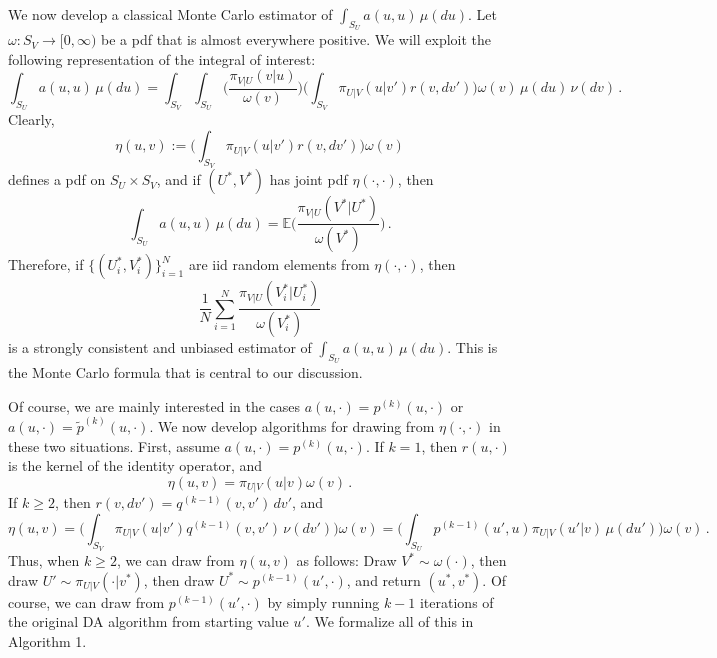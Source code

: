 \documentclass[11pt]{article}
\begin{document}
        We now develop a classical Monte Carlo estimator of
        $\int_{S_U} a(u,u) \, \mu(du)$.  Let $\omega:S_V \to
        [0,\infty)$ be a pdf that is almost everywhere positive.  We
        will exploit the following representation of the integral of
        interest:
	\begin{equation}\label{rep}
          \int_{S_U} a(u,u) \, \mu(du) = \int_{S_V} \int_{S_U} \bigg(\frac{\pi_{V|U}(v|u)}{\omega(v)}\bigg) \Big(\int_{S_V} \pi_{U|V}(u|v') r(v,dv') \Big) \omega(v) \, \mu(du) \,\nu(dv) \,.
	\end{equation}
	Clearly,
	\[
	\eta(u,v) := \Big(\int_{S_V} \pi_{U|V}(u|v') r(v,dv') \Big)
        \omega(v)
	\]
	defines a pdf on $S_U \times S_V$, and if $(U^*,V^*)$ has
        joint pdf $\eta(\cdot,\cdot)$, then
	\[
	\int_{S_U} a(u,u) \, \mu(du) = \mathbb{E} \bigg(
        \frac{\pi_{V|U}(V^*|U^*)}{\omega(V^*)} \bigg) \,.
	\]
        Therefore, if $\{(U^*_i,V^*_i)\}_{i=1}^{N}$ are iid random
        elements from $\eta(\cdot,\cdot)$, then
	\begin{equation} 
           \label{estimator}
           \frac{1}{N} \sum_{i=1}^{N} \frac{\pi_{V|U}(V^*_i|U^*_i)}{\omega(V^*_i)}
	\end{equation}
        is a strongly consistent and unbiased estimator of $\int_{S_U}
        a(u,u) \, \mu(du)$.  This is the Monte Carlo formula that is
        central to our discussion.

        Of course, we are mainly interested in the cases $a(u,\cdot) =
        p^{(k)}(u,\cdot)$ or $a(u,\cdot) = \tilde{p}^{(k)}(u,\cdot)$.
        We now develop algorithms for drawing from $\eta(\cdot,\cdot)$
        in these two situations.  First, assume $a(u,\cdot) =
        p^{(k)}(u,\cdot)$.  If $k=1$, then $r(u,\cdot)$ is the
        kernel of the identity operator, and
	\[
	\eta(u,v) = \pi_{U|V}(u|v) \omega(v) \,.
	\]
        If $k \ge 2$, then $r(v,dv') = q^{(k-1)}(v,v') \, dv'$, and
	\begin{equation*}
          \eta(u,v) = \Big( \int_{S_V} \pi_{U|V}(u|v') q^{(k-1)}(v,v')
          \, \nu(dv') \Big) \omega(v) = \Big( \int_{S_U} p^{(k-1)}(u',u)
          \pi_{U|V}(u'|v) \, \mu(du') \Big) \omega(v) \,.
	\end{equation*}
        Thus, when $k \ge 2$, we can draw from $\eta(u,v)$ as follows:
        Draw $V^* \sim \omega(\cdot)$, then draw $U' \sim
        \pi_{U|V}(\cdot|v^*)$, then draw $U^* \sim
        p^{(k-1)}(u',\cdot)$, and return $(u^*,v^*)$.  Of course, we
        can draw from $p^{(k-1)}(u',\cdot)$ by simply running $k-1$
        iterations of the original DA algorithm from starting value
        $u'$.  We formalize all of this in Algorithm 1.
\end{document}
